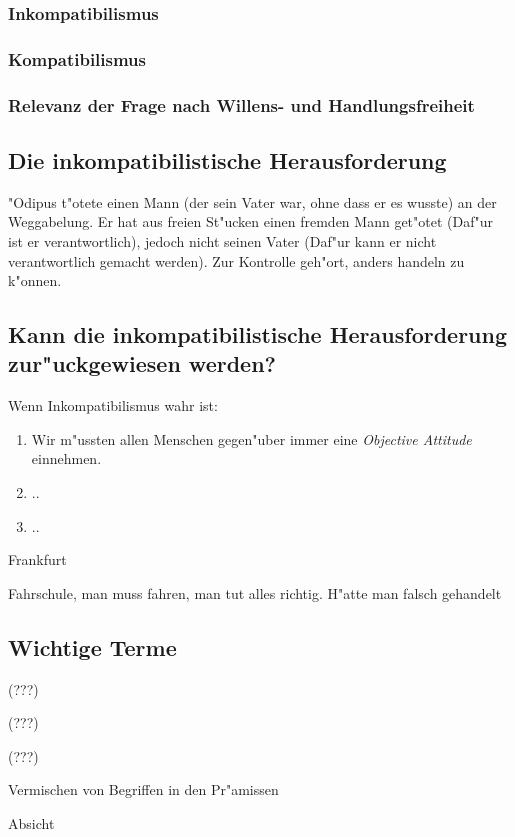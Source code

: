 \documentclass[emulatestandardclasses]{scrartcl}
\begin{document}
\subsubsection{Inkompatibilismus}

\subsubsection{Kompatibilismus}

\subsubsection{Relevanz der Frage nach Willens- und Handlungsfreiheit}

\subsection{Die inkompatibilistische Herausforderung}

"Odipus t"otete einen Mann (der sein Vater war, ohne dass er es wusste) an der Weggabelung. Er hat aus freien St"ucken einen fremden Mann get"otet (Daf"ur ist er verantwortlich), jedoch nicht seinen Vater (Daf"ur kann er nicht verantwortlich gemacht werden). Zur Kontrolle geh"ort, anders handeln zu k"onnen.

\subsection{Kann die inkompatibilistische Herausforderung zur"uckgewiesen werden?}
Wenn Inkompatibilismus wahr ist: 
\begin{enumerate}
  \item Wir m"ussten allen Menschen gegen"uber immer eine \emph{Objective Attitude} einnehmen.
  \item ..
  \item ..
\end{enumerate}

Frankfurt

Fahrschule, man muss fahren, man tut alles richtig. H"atte man falsch gehandelt
\subsection{Wichtige Terme}

\begin{description}[leftmargin=!,labelwidth=\widthof{\bfseries Moralische Verantwortlichke}]
  \item[Kontrolle] {\color{red}(???)}
  \item[Moralische Verantwortlichkeit] {\color{red}(???)}
  \item[Objective Attitude] {\color{red}(???)}
  \item["Aquivokationsfehlschlu\ss] Vermischen von Begriffen in den Pr"amissen
  \item[Intention] Absicht  
\end{description}
\end{document}
